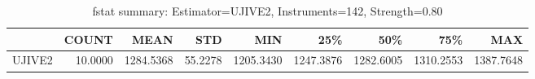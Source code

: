 \begin{table}[ht]
\centering
\caption{fstat summary: Estimator=UJIVE2, Instruments=142, Strength=0.80}
\begin{tabular}{lrrrrrrrr}
\toprule
 & COUNT & MEAN & STD & MIN & 25\% & 50\% & 75\% & MAX \\
\midrule
UJIVE2 & 10.0000 & 1284.5368 & 55.2278 & 1205.3430 & 1247.3876 & 1282.6005 & 1310.2553 & 1387.7648 \\
\bottomrule
\end{tabular}
\end{table}
